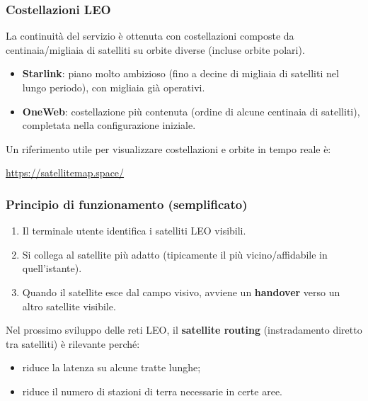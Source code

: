 \subsubsection*{Costellazioni LEO}
La continuità del servizio è ottenuta con costellazioni composte da centinaia/migliaia di satelliti su orbite diverse (incluse orbite polari).

\begin{itemize}
	\item \textbf{Starlink}: piano molto ambizioso (fino a decine di migliaia di satelliti nel lungo periodo), con migliaia già operativi.
	\item \textbf{OneWeb}: costellazione più contenuta (ordine di alcune centinaia di satelliti), completata nella configurazione iniziale.
\end{itemize}
\noindent
Un riferimento utile per visualizzare costellazioni e orbite in tempo reale è:
\begin{center}
\url{https://satellitemap.space/}
\end{center}

\subsubsection*{Principio di funzionamento (semplificato)}
\begin{enumerate}
	\item Il terminale utente identifica i satelliti LEO visibili.
	\item Si collega al satellite più adatto (tipicamente il più vicino/affidabile in quell'istante).
	\item Quando il satellite esce dal campo visivo, avviene un \textbf{handover} verso un altro satellite visibile.
\end{enumerate}
\noindent
Nel prossimo sviluppo delle reti LEO, il \textbf{satellite routing} (instradamento diretto tra satelliti) è rilevante perché:
\begin{itemize}
	\item riduce la latenza su alcune tratte lunghe;
	\item riduce il numero di stazioni di terra necessarie in certe aree.
\end{itemize}


